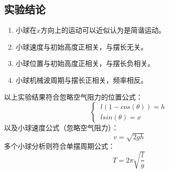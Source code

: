 \documentclass[UTF8]{article}
\begin{document}
        \subsection{实验结论}
            \begin{enumerate}[left=2em, label=\arabic*)]
                \item 小球在$x$方向上的运动可以近似认为是简谐运动。
                \item 小球速度与初始高度正相关，与摆长无关。
                \item 小球位置与初始高度正相关，与摆长负相关。
                \item 小球机械波周期与摆长正相关，频率相反。
            \end{enumerate}
            以上实验结果符合忽略空气阻力的位置公式：
            \begin{equation*}
                \begin{cases}
                    \ l(1-cos(\theta)) = h \\
                    \ lsin(\theta) = x
                \end{cases}
            \end{equation*}
            以及小球速度公式（忽略空气阻力）：
            \begin{equation*}
                v = \sqrt{2gh}
            \end{equation*}
            多个小球分析则符合单摆周期公式：
            \begin{equation*}
                T = 2\pi \sqrt{\frac{l}{g}}
            \end{equation*}
\end{document}
